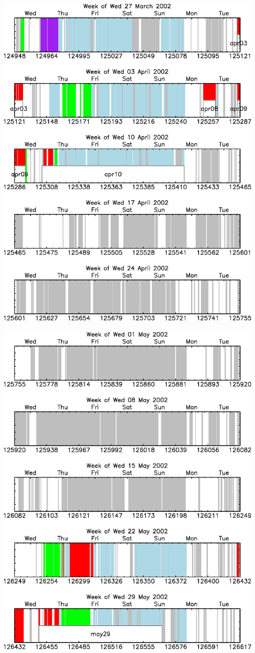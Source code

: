 \documentclass[12pt]{article}
\begin{document}
\mbox{ } \vfill \includegraphics[width=\linewidth]{fits2_dates05.eps} \vfill \mbox{ } \pagebreak
\mbox{ } \vfill \includegraphics[width=\linewidth]{fits2_dates06.eps} \vfill \mbox{ } \pagebreak
\end{document}
